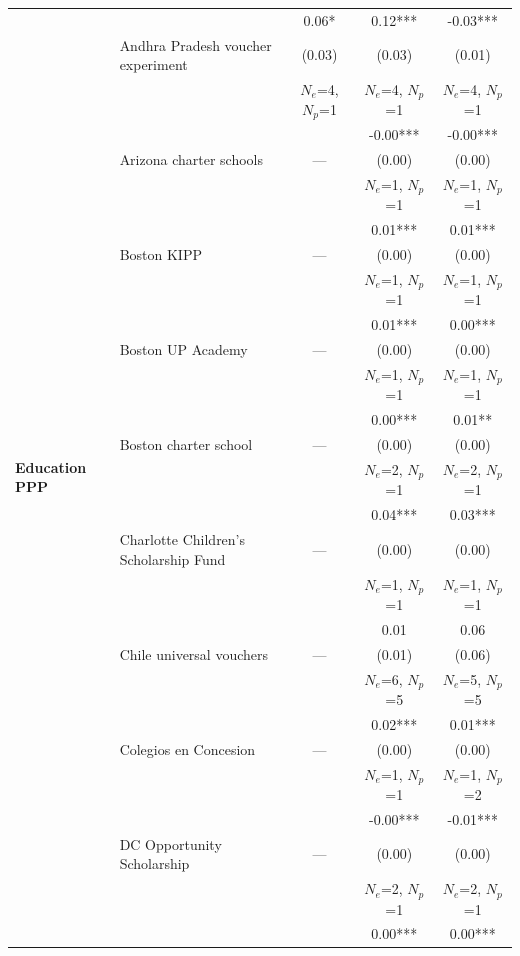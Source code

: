 \begin{longtable}{@{\extracolsep{\fill}} l l c c c @{}}
\multirow{105}{*}{\textbf{Education PPP}}
  &  & 0.06* & 0.12*** & -0.03*** \\
  & Andhra Pradesh voucher experiment & (0.03) & (0.03) & (0.01) \\
  &  & $N_e$=4, $N_p$=1 & $N_e$=4, $N_p$=1 & $N_e$=4, $N_p$=1 \\
\cmidrule(lr){2-5}
  &  &  & -0.00*** & -0.00*** \\
  & Arizona charter schools & --- & (0.00) & (0.00) \\
  &  &  & $N_e$=1, $N_p$=1 & $N_e$=1, $N_p$=1 \\
\cmidrule(lr){2-5}
  &  &  & 0.01*** & 0.01*** \\
  & Boston KIPP & --- & (0.00) & (0.00) \\
  &  &  & $N_e$=1, $N_p$=1 & $N_e$=1, $N_p$=1 \\
\cmidrule(lr){2-5}
  &  &  & 0.01*** & 0.00*** \\
  & Boston UP Academy & --- & (0.00) & (0.00) \\
  &  &  & $N_e$=1, $N_p$=1 & $N_e$=1, $N_p$=1 \\
\cmidrule(lr){2-5}
  &  &  & 0.00*** & 0.01** \\
  & Boston charter school & --- & (0.00) & (0.00) \\
  &  &  & $N_e$=2, $N_p$=1 & $N_e$=2, $N_p$=1 \\
\cmidrule(lr){2-5}
  &  &  & 0.04*** & 0.03*** \\
  & Charlotte Children's Scholarship Fund & --- & (0.00) & (0.00) \\
  &  &  & $N_e$=1, $N_p$=1 & $N_e$=1, $N_p$=1 \\
\cmidrule(lr){2-5}
  &  &  & 0.01 & 0.06 \\
  & Chile universal vouchers & --- & (0.01) & (0.06) \\
  &  &  & $N_e$=6, $N_p$=5 & $N_e$=5, $N_p$=5 \\
\cmidrule(lr){2-5}
  &  &  & 0.02*** & 0.01*** \\
  & Colegios en Concesion & --- & (0.00) & (0.00) \\
  &  &  & $N_e$=1, $N_p$=1 & $N_e$=1, $N_p$=2 \\
\cmidrule(lr){2-5}
  &  &  & -0.00*** & -0.01*** \\
  & DC Opportunity Scholarship & --- & (0.00) & (0.00) \\
  &  &  & $N_e$=2, $N_p$=1 & $N_e$=2, $N_p$=1 \\
\cmidrule(lr){2-5}
  &  &  & 0.00*** & 0.00*** \\

\end{longtable}
